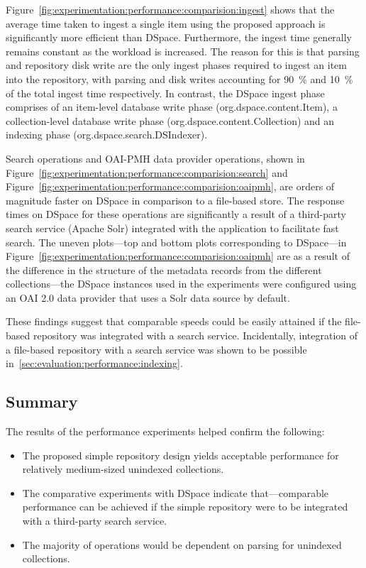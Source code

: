 Figure~\ref{fig:experimentation:performance:comparision:ingest} shows that the average time taken to ingest a single item using the proposed approach is significantly more efficient than DSpace. Furthermore, the ingest time generally remains constant as the workload is increased. The reason for this is that parsing and repository disk write are the only ingest phases required to ingest an item into the repository, with parsing and disk writes accounting for {\SI{90}\percent} and {\SI{10}\percent} of the total ingest time respectively. In contrast, the DSpace ingest phase comprises of an item-level database write phase (org.dspace.content.Item), a collection-level database write phase (org.dspace.content.Collection) and an indexing phase (org.dspace.search.DSIndexer).

Search operations and OAI-PMH data provider operations, shown in Figure~\ref{fig:experimentation:performance:comparision:search} and Figure~\ref{fig:experimentation:performance:comparision:oaipmh}, are orders of magnitude faster on DSpace in comparison to a file-based store. The response times on DSpace for these operations are significantly a result of a third-party search service (Apache Solr) integrated with the application to facilitate fast search. The uneven plots---top and bottom plots corresponding to DSpace---in Figure~\ref{fig:experimentation:performance:comparision:oaipmh} are as a result of the difference in the structure of the metadata records from the different collections---the DSpace instances used in the experiments were configured using an OAI 2.0 data provider that uses a Solr data source by default.

These findings suggest that comparable speeds could be easily attained if the file-based repository was integrated with a search service. Incidentally, integration of a file-based repository with a search service was shown to be possible in~\ref{sec:evaluation:performance:indexing}.

\subsection{Summary}
\label{sec:evaluation:performance:conclusion}

The results of the performance experiments helped confirm the following:

\begin{itemize}
 \item The proposed simple repository design yields acceptable performance for relatively medium-sized unindexed collections.
 \item The comparative experiments with DSpace indicate that---comparable performance can be achieved if the simple repository were to be integrated with a third-party search service.
 \item The majority of operations would be dependent on parsing for unindexed collections.
\end{itemize}